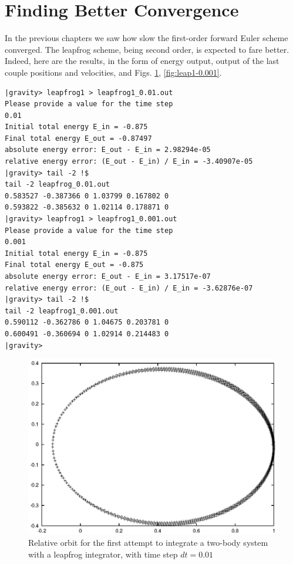 \section{Finding Better Convergence}

In the previous chapters we saw how slow the first-order forward Euler
scheme converged.  The leapfrog scheme, being second order, is
expected to fare better.  Indeed, here are the results, in the form of
energy output, output of the last couple positions and velocities, and
Figs. \ref{fig:leap1-0.01}, \ref{fig:leap1-0.001}.

\begin{small}
\begin{verbatim}
|gravity> leapfrog1 > leapfrog1_0.01.out
Please provide a value for the time step
0.01
Initial total energy E_in = -0.875
Final total energy E_out = -0.87497
absolute energy error: E_out - E_in = 2.98294e-05
relative energy error: (E_out - E_in) / E_in = -3.40907e-05
|gravity> tail -2 !$
tail -2 leapfrog_0.01.out
0.583527 -0.387366 0 1.03799 0.167802 0
0.593822 -0.385632 0 1.02114 0.178871 0
|gravity> leapfrog1 > leapfrog1_0.001.out
Please provide a value for the time step
0.001
Initial total energy E_in = -0.875
Final total energy E_out = -0.875
absolute energy error: E_out - E_in = 3.17517e-07
relative energy error: (E_out - E_in) / E_in = -3.62876e-07
|gravity> tail -2 !$
tail -2 leapfrog1_0.001.out
0.590112 -0.362786 0 1.04675 0.203781 0
0.600491 -0.360694 0 1.02914 0.214483 0
|gravity>
\end{verbatim}
\end{small}

\begin{figure}[htb]
\centering
\includegraphics[width=4.5in]{chap4/leapfrog1_0.01.ps}
\caption[Two-body orbit with a leapfrog integrator, time step $dt = 0.01$]
{Relative orbit for the first attempt to integrate a two-body system with a
leapfrog integrator, with time step $dt = 0.01$}
\label{fig:leap1-0.01}
\end{figure}

